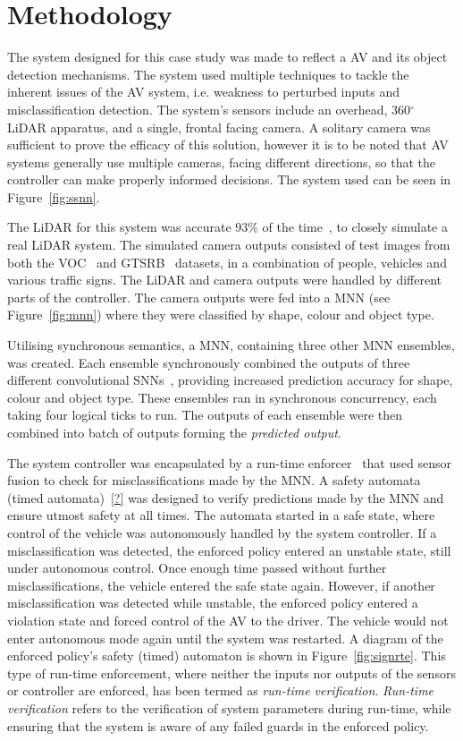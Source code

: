 \section{Methodology} 
The system designed for this case study was made to reflect a \acf{AV} and its object detection mechanisms. 
The system used multiple techniques to tackle the inherent issues of the \ac{AV} system, i.e. weakness to perturbed inputs and misclassification detection.
The system's sensors include an overhead, 360$^\circ$ \acf{LiDAR} apparatus, and a single, frontal facing camera.
A solitary camera was sufficient to prove the efficacy of this solution, however it is to be noted that \ac{AV} systems generally use multiple cameras, facing different directions, so that the controller can make properly informed decisions.
The system used can be seen in Figure~\ref{fig:ssnn}. 

The \ac{LiDAR} for this system was accurate 93\% of the time~\cite{lidarFusion}, to closely simulate a real \ac{LiDAR} system.
The simulated camera outputs consisted of test images from both the \ac{VOC}~\cite{pascal-voc-2012} and \ac{GTSRB}~\cite{Stallkamp2012-gtsrb} datasets, in a combination of people, vehicles and various traffic signs.
The \ac{LiDAR} and camera outputs were handled by different parts of the controller.
The camera outputs were fed into a \ac{MNN} (see Figure~\ref{fig:mnn}) where they were classified by shape, colour and object type.

Utilising synchronous semantics, a \acf{MNN}, containing three other \ac{MNN} ensembles, was created.
Each ensemble synchronously combined the outputs of three different convolutional \acfp{SNN}~\cite{sann}, providing increased prediction accuracy for shape, colour and object type. 
These ensembles ran in synchronous concurrency, each taking four logical ticks to run. 
The outputs of each ensemble were then combined into batch of outputs forming the \textit{predicted output}. 

The system controller was encapsulated by a run-time enforcer~\cite{recps} that used sensor fusion to check for misclassifications made by the \ac{MNN}.
A safety automata (timed automata)~\ref{?} was designed to verify predictions made by the \ac{MNN} and ensure utmost safety at all times.
The automata started in a safe state, where control of the vehicle was autonomously handled by the system controller.
If a misclassification was detected, the enforced policy entered an unstable state, still under autonomous control. 
Once enough time passed without further misclassifications, the vehicle entered the safe state again.
However, if another misclassification was detected while unstable, the enforced policy entered a violation state and forced control of the \ac{AV} to the driver.
The vehicle would not enter autonomous mode again until the system was restarted.
A diagram of the enforced policy's safety (timed) automaton is shown in Figure~\ref{fig:signrte}.
This type of run-time enforcement, where neither the inputs nor outputs of the sensors or controller are enforced, has been termed as \textit{run-time verification}.
\textit{Run-time verification} refers to the verification of system parameters during run-time, while ensuring that the system is aware of any failed guards in the enforced policy.


